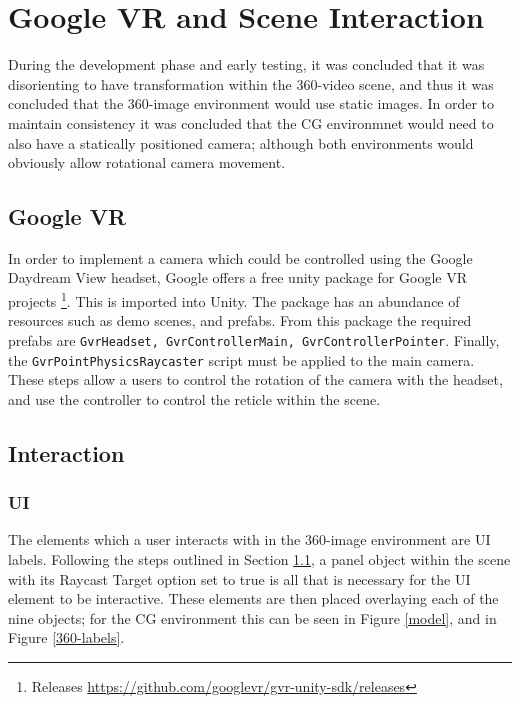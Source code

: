 \documentclass[a4paper, openright, twoside]{report}
\begin{document}
\section{Google VR and Scene Interaction}
During the development phase and early testing, it was concluded that it was disorienting to have transformation within the 360-video scene, and thus it was concluded that the 360-image environment would use static images. In order to maintain consistency it was concluded that the CG environmnet would need to also have a statically positioned camera; although both environments would obviously allow rotational camera movement.  

\subsection{Google VR}\label{googlevr}

In order to implement a camera which could be controlled using the Google Daydream View headset, Google offers a free unity package for Google VR projects \footnote{Releases \url{https://github.com/googlevr/gvr-unity-sdk/releases}}. This is imported into Unity. The package has an abundance of resources such as demo scenes, and prefabs. From this package the required prefabs are \lstinline{GvrHeadset, GvrControllerMain, GvrControllerPointer}. Finally, the \lstinline{GvrPointPhysicsRaycaster} script must be applied to the main camera. These steps allow a users to control the rotation of the camera with the headset, and use the controller to control the reticle within the scene. 

\subsection{Interaction}

\subsubsection{UI}
The elements which a user interacts with in the 360-image environment are UI labels. Following the steps outlined in Section \ref{googlevr}, a panel object within the scene with its Raycast Target option set to true is all that is necessary for the UI element to be interactive. These elements are then placed overlaying each of the nine objects; for the CG environment this can be seen in Figure \ref{model}, and in Figure \ref{360-labels}. 
\end{document}
